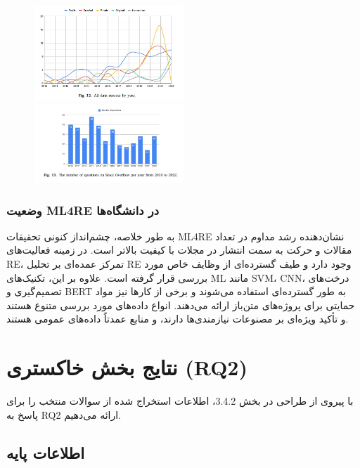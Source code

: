 \documentclass[a4paper,10pt]{article}
\begin{document}
                \begin{figure}
                    \centering
                    \includegraphics[width=0.5\textwidth]{Image/fig-12.jpg}
                    \includegraphics[width=0.5\textwidth]{Image/fig-13.jpg}
                \end{figure}

            \subsubsection{وضعیت ML4RE در دانشگاه‌ها}

                به طور خلاصه، چشم‌انداز کنونی تحقیقات ML4RE نشان‌دهنده رشد مداوم در تعداد مقالات و حرکت به سمت انتشار در مجلات با کیفیت بالاتر است. در زمینه فعالیت‌های RE، تمرکز عمده‌ای بر تحلیل RE وجود دارد و طیف گسترده‌ای از وظایف خاص مورد بررسی قرار گرفته است. علاوه بر این، تکنیک‌های ML مانند SVM، CNN، درخت‌های تصمیم‌گیری و BERT به طور گسترده‌ای استفاده می‌شوند و برخی از کارها نیز مواد حمایتی برای پروژه‌های متن‌باز ارائه می‌دهند. انواع داده‌های مورد بررسی متنوع هستند و تأکید ویژه‌ای بر مصنوعات نیازمندی‌ها دارند، و منابع عمدتاً داده‌های عمومی هستند.


    \section{نتایج بخش خاکستری (RQ2)}

        با پیروی از طراحی در بخش 3.4.2، اطلاعات استخراج شده از سوالات منتخب را برای پاسخ به RQ2 ارائه می‌دهیم.

        \subsection{اطلاعات پایه}
\end{document}
